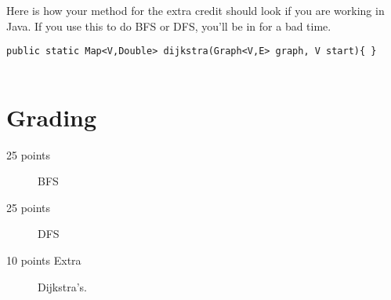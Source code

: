 \documentclass[10pt,letterpaper]{article}
\begin{document}
 	Here is how your method for the extra credit should look if you are working in Java.
 	If you use this to do BFS or DFS, you'll be in for a bad time.
 	
\begin{lstlisting}
public static Map<V,Double> dijkstra(Graph<V,E> graph, V start){ }
 	
\end{lstlisting}
 	
 	
 	\section*{Grading}
 		\begin{description}
 		\item[25 points] BFS
 		\item[25 points] DFS
 		\item[10 points Extra]  Dijkstra's.
 		\end{description}
 	
 	
 	
 	
\end{document}

